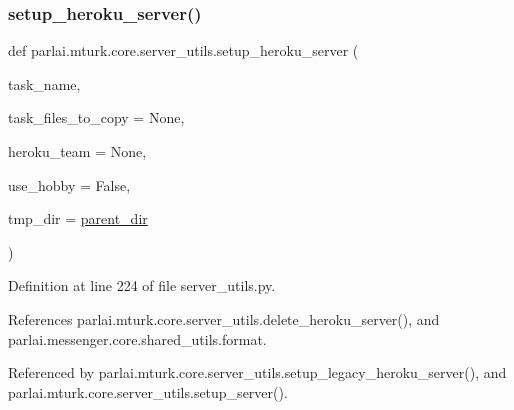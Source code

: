 \subsubsection{\texorpdfstring{setup\+\_\+heroku\+\_\+server()}{setup\_heroku\_server()}}
{\footnotesize\ttfamily def parlai.\+mturk.\+core.\+server\+\_\+utils.\+setup\+\_\+heroku\+\_\+server (\begin{DoxyParamCaption}\item[{}]{task\+\_\+name,  }\item[{}]{task\+\_\+files\+\_\+to\+\_\+copy = {\ttfamily None},  }\item[{}]{heroku\+\_\+team = {\ttfamily None},  }\item[{}]{use\+\_\+hobby = {\ttfamily False},  }\item[{}]{tmp\+\_\+dir = {\ttfamily \hyperlink{namespaceparlai_1_1mturk_1_1core_1_1server__utils_a193439bdbc25a32b00f1a43e6f8532d8}{parent\+\_\+dir}} }\end{DoxyParamCaption})}



Definition at line 224 of file server\+\_\+utils.\+py.



References parlai.\+mturk.\+core.\+server\+\_\+utils.\+delete\+\_\+heroku\+\_\+server(), and parlai.\+messenger.\+core.\+shared\+\_\+utils.\+format.



Referenced by parlai.\+mturk.\+core.\+server\+\_\+utils.\+setup\+\_\+legacy\+\_\+heroku\+\_\+server(), and parlai.\+mturk.\+core.\+server\+\_\+utils.\+setup\+\_\+server().

